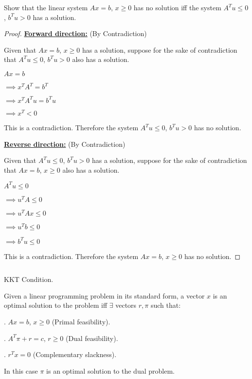 \documentclass{article}
\begin{document}
\begin{customthm}{16}
  $ $
  
  Show that the linear system $Ax=b$, $x\geq 0$ has no solution iff the system $A^Tu \leq 0$, $b^Tu > 0$ has a solution.

\end{customthm}

\begin{proof}
  
  \textbf{\underline{Forward direction:}} (By Contradiction)

  Given that $Ax=b$, $x\geq 0$ has a solution, suppose for the sake of contradiction that $A^Tu \leq 0$, $b^Tu > 0$ also has a solution.

  $Ax = b$

  \noindent
  $\implies x^TA^T = b^T$

  \noindent
  $\implies x^TA^Tu = b^Tu$

  \noindent
  $\implies x^T < 0$
  \newline

  This is a contradiction. Therefore the system $A^Tu \leq 0$, $b^Tu > 0$ has no solution.
  \newline


  \textbf{\underline{Reverse direction:}} (By Contradiction)

  Given that $A^Tu \leq 0$, $b^Tu > 0$ has a solution, suppose for the sake of contradiction that $Ax=b$, $x\geq 0$ also has a solution.

  $A^Tu \leq 0$

  \noindent
  $\implies u^TA \leq 0$

  \noindent
  $\implies u^TAx \leq 0$

  \noindent
  $\implies u^Tb \leq 0$

  \noindent
  $\implies b^Tu \leq 0$
  \newline

  This is a contradiction. Therefore the system $Ax=b$, $x\geq 0$ has no solution.

  
\end{proof}
\newpage

\begin{customthm}{17}
  $ $
  
  KKT Condition.

  Given a linear programming problem in its standard form, a vector $x$ is an optimal solution to the problem iff $\exists$ vectors  $r, \pi$ such that:

  . $Ax=b$, $x\geq 0$ \qquad (Primal feasibility).
  
  . $A^T \pi + r = c$, $r \geq 0$ \qquad (Dual feasibility). 
  
  . $r^Tx = 0$ \qquad (Complementary slackness).
  \newline

  In this case $\pi$ is an optimal solution to the dual problem.

\end{customthm}
\newpage
\end{document}
